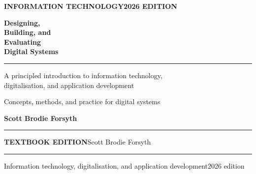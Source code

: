 \begin{titlepage}
\pagecolor{covernavy}
\thispagestyle{empty}

\sffamily
\vspace*{23mm}
\begin{center}
\begin{minipage}{0.82\textwidth}
  {\small\bfseries\color{coverteal} INFORMATION TECHNOLOGY\hfill 2026 EDITION\par}
  \vspace{15mm}
  {\color{white}\bfseries\fontsize{29}{34}\selectfont
    Designing,\\[-1pt]
    Building, and\\[-1pt]
    Evaluating\\[-1pt]
    {\color{coverteal}Digital Systems}\par}
  \vspace{9mm}
  \textcolor{covercoral}{\rule{0.31\textwidth}{1.4pt}}\par
  \vspace{7mm}
  {\color{covermist}\large
    A principled introduction to information technology,\\
    digitalisation, and application development\par}
  \vspace{9mm}
  {\color{white}\normalsize
    Concepts, methods, and practice for digital systems\par}
  \vspace{7mm}
  {\color{white}\large\bfseries Scott Brodie Forsyth\par}
  \vspace{5mm}
  \textcolor{covercoral}{\rule{0.14\textwidth}{1.4pt}}\par
\end{minipage}
\end{center}

\vfill
\begin{center}
\begin{minipage}{0.82\textwidth}
  \color{covermist}\small
  \textbf{TEXTBOOK EDITION}\hfill Scott Brodie Forsyth\par
  \vspace{2mm}
  \rule{\textwidth}{0.35pt}\par
  \vspace{2mm}
  \scriptsize Information technology, digitalisation, and application development\hfill 2026 edition\par
\end{minipage}
\end{center}
\end{titlepage}
\pagecolor{white}
\color{ink}
